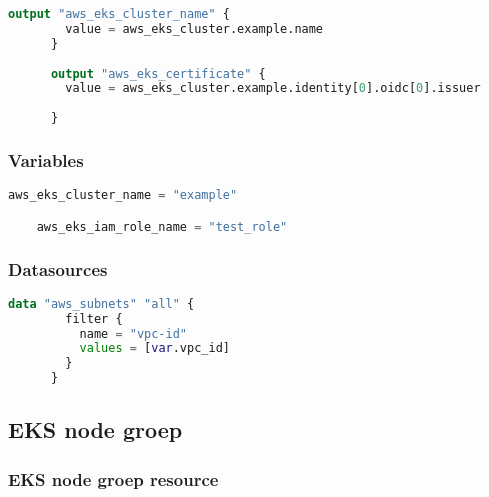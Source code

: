 \begin{lstlisting}[language=terraform]
    output "aws_eks_cluster_name" {
        value = aws_eks_cluster.example.name
      }
      
      output "aws_eks_certificate" {
        value = aws_eks_cluster.example.identity[0].oidc[0].issuer
        
      }
\end{lstlisting}

\subsubsection{
{Variables}}

\begin{lstlisting}[language=terraform]
    aws_eks_cluster_name = "example"

    aws_eks_iam_role_name = "test_role"
\end{lstlisting}

\subsubsection{
{Datasources}}

\begin{lstlisting}[language=terraform]
    data "aws_subnets" "all" {
        filter {
          name = "vpc-id"
          values = [var.vpc_id]
        }
      }
\end{lstlisting}

\subsection{
{EKS node groep}}
\label{sec:EKS node groep}

\subsubsection{
{EKS node groep resource}}

